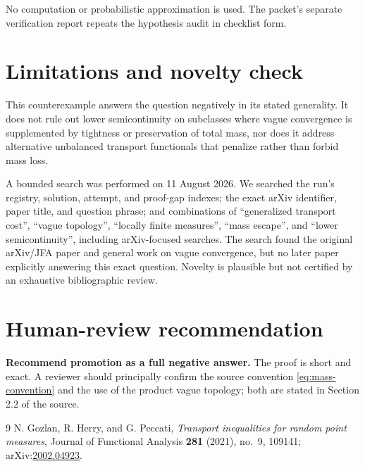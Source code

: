 \documentclass[11pt]{article}
\begin{document}
No computation or probabilistic approximation is used.  The packet's separate
verification report repeats the hypothesis audit in checklist form.

\section{Limitations and novelty check}

This counterexample answers the question negatively in its stated generality.
It does not rule out lower semicontinuity on subclasses where vague convergence
is supplemented by tightness or preservation of total mass, nor does it
address alternative unbalanced transport functionals that penalize rather
than forbid mass loss.

A bounded search was performed on 11 August 2026.  We searched the run's
registry, solution, attempt, and proof-gap indexes; the exact arXiv identifier,
paper title, and question phrase; and combinations of ``generalized transport
cost'', ``vague topology'', ``locally finite measures'', ``mass escape'', and
``lower semicontinuity'', including arXiv-focused searches.  The search found
the original arXiv/JFA paper and general work on vague convergence, but no
later paper explicitly answering this exact question.  Novelty is plausible
but not certified by an exhaustive bibliographic review.

\enlargethispage{5\baselineskip}
\section{Human-review recommendation}

\textbf{Recommend promotion as a full negative answer.}  The proof is short
and exact.  A reviewer should principally confirm the source convention
\eqref{eq:mass-convention} and the use of the product vague topology; both are
stated in Section 2.2 of the source.

{\small
\begin{thebibliography}{9}
N. Gozlan, R. Herry, and G. Peccati,
\emph{Transport inequalities for random point measures},
Journal of Functional Analysis \textbf{281} (2021), no.~9, 109141;
arXiv:\href{https://arxiv.org/abs/2002.04923}{2002.04923}.
\end{thebibliography}
}
\end{document}
